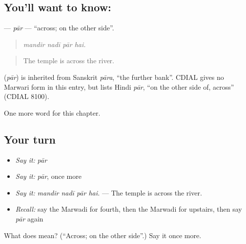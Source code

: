 \subsection*{You'll want to know: }
\textbf{} — \emph{pār} — \textquotedblleft{}across; on the other side\textquotedblright{}.

\begin{quote}
   
\end{quote}

\begin{quote}
\emph{mandir nadī pār hai.}
\end{quote}

\begin{quote}
The temple is across the river.
\end{quote}

\begin{cousinweb}
\textbf{} (\emph{pār}) is inherited from Sanskrit \emph{pāra}, \textquotedblleft{}the further bank\textquotedblright{}. CDIAL gives no Marwari form in this entry, but lists Hindi \emph{pār}, \textquotedblleft{}on the other side of, across\textquotedblright{} (CDIAL 8100).
\end{cousinweb}

\begin{grammarlens}[title={What you've built}]
One more word for this chapter.
\end{grammarlens}

\subsection*{Your turn}
\begin{itemize}
\raggedright
  \item \emph{Say it:} \emph{pār}
  \item \emph{Say it:} \emph{pār}, once more
  \item \emph{Say it:} \emph{mandir nadī pār hai.} — The temple is across the river.
  \item \emph{Recall:} say the Marwadi for fourth, then the Marwadi for upstairs, then say \emph{pār} again
\end{itemize}

\begin{tcolorbox}[breakable,colback=teal!4,colframe=teal!35!black,title={Before you move on}]
What does  mean? (\textquotedblleft{}Across; on the other side\textquotedblright{}.) Say it once more.
\end{tcolorbox}
